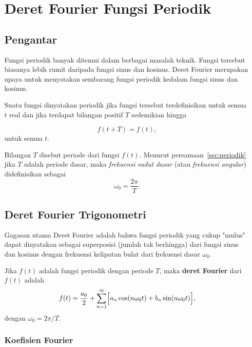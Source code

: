 \chapter{Deret Fourier Fungsi Periodik}

\section*{Pengantar}
Fungsi periodik banyak ditemui dalam berbagai masalah teknik. Fungsi tersebut biasanya lebih rumit daripada fungsi sinus dan kosinus. Deret Fourier merupakan upaya untuk menyatakan sembarang fungsi periodik kedalam fungsi sinus dan kosinus.

Suatu fungsi dinyatakan periodik jika fungsi tersebut terdefinisikan untuk semua $t$ real dan jika terdapat bilangan positif $T$ sedemikian hingga

\begin{equation}
\label{sec:periodik}
f(t+T)=f(t),  
\end{equation}
untuk semua $t$.

Bilangan $T$ disebut periode dari fungsi $f(t)$. Menurut persamaan~\ref{sec:periodik} jika $T$ adalah periode dasar, maka \textit{frekuensi sudut dasar} (atau \textit{frekuensi angular}) didefinisikan sebagai
\begin{equation}
\omega_0 = \frac{2\pi}{T}.
\end{equation}

\section{Deret Fourier Trigonometri}

Gagasan utama Deret Fourier adalah bahwa fungsi periodik yang cukup "mulus" dapat dinyatakan sebagai superposisi (jumlah tak berhingga) dari fungsi sinus dan kosinus dengan frekuensi kelipatan bulat dari frekuensi dasar $\omega_0$.

Jika $f(t)$ adalah fungsi periodik dengan periode $T$, maka \textbf{deret Fourier} dari $f(t)$ adalah
\begin{equation}
f(t) = \frac{a_0}{2} + \sum_{n=1}^{\infty}\Bigl[a_n \cos(n\omega_0 t) + b_n \sin(n\omega_0 t)\Bigr],
\label{eq:deret-fourier}
\end{equation}
dengan $\omega_0 = 2\pi/T$.

\subsection{Koefisien Fourier}

